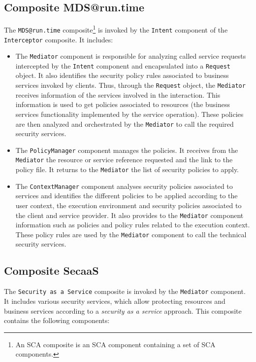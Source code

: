 \documentclass[runningheads,a4paper]{llncs}
\begin{document}
\subsection{Composite MDS@run.time}
The \texttt{MDS@run.time} composite\footnote{An SCA composite is an SCA component containing a set of SCA components.} is invoked by the \texttt{Intent} component of the \texttt{Inter\-ceptor} composite. It includes:

\begin{itemize}

\item The \texttt{Mediator} component is responsible for analyzing called service requests intercepted by the \texttt{Intent} component and  encapsulated into a \texttt{Request} object. It also identifies the security policy rules associated to business services invoked by clients. Thus, through the \texttt{Request} object, the \texttt{Mediator} receives information of the services involved in the interaction. This information is used to get policies associated to resources (the business services functionality implemented by the service operation). These policies are then analyzed and orchestrated by the \texttt{Mediator} to call the required security services.
\item The \texttt{PolicyManager} component manages the policies. It receives from the \texttt{Mediator} the resource or service reference requested and the link to the policy file. It returns to the \texttt{Mediator} the list of security policies to apply.
\item The \texttt{ContextManager} component analyses security policies associated to services and identifies the different policies to be applied according to the user context, the execution environment and security policies associated to the client and service provider. It also provides to the \texttt{Mediator} component information such as policies and policy rules related to the execution context. These policy rules are used by the \texttt{Mediator} component to call the technical security services.
\end{itemize}


\subsection{Composite SecaaS}

The \texttt{Security as a Service} composite is invoked by the \texttt{Mediator} component. It includes various security services, which allow protecting resources and business services according to a \textit{security as a service} approach. This composite contains the following components:
\end{document}
